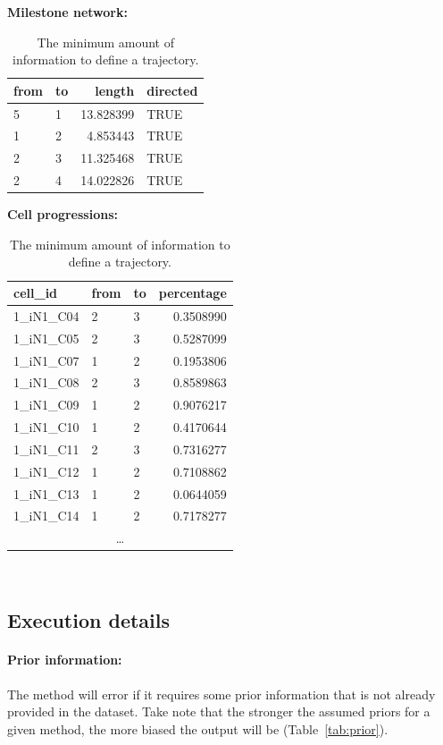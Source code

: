 \begin{table}
	\caption{The minimum amount of information to define a trajectory.}\label{tab:trajdata}
	\hfill
	\begin{minipage}[t]{.4\linewidth}
		\footnotesize
		\textbf{Milestone network:}

		\begin{tabular}{llrl}
			\toprule
			from & to & length & directed\\
			\midrule
			5 & 1 & 13.828399 & TRUE\\
			1 & 2 & 4.853443 & TRUE\\
			2 & 3 & 11.325468 & TRUE\\
			2 & 4 & 14.022826 & TRUE\\
			\bottomrule
		\end{tabular}
	\end{minipage}
	\hfill
	\begin{minipage}[t]{.4\linewidth}
		\footnotesize
		\textbf{Cell progressions:}

		\begin{tabular}{lllr}
		\toprule
		cell\_id & from & to & percentage\\
		\midrule
		1\_iN1\_C04 & 2 & 3 & 0.3508990\\
		1\_iN1\_C05 & 2 & 3 & 0.5287099\\
		1\_iN1\_C07 & 1 & 2 & 0.1953806\\
		1\_iN1\_C08 & 2 & 3 & 0.8589863\\
		1\_iN1\_C09 & 1 & 2 & 0.9076217\\
		1\_iN1\_C10 & 1 & 2 & 0.4170644\\
		1\_iN1\_C11 & 2 & 3 & 0.7316277\\
		1\_iN1\_C12 & 1 & 2 & 0.7108862\\
		1\_iN1\_C13 & 1 & 2 & 0.0644059\\
		1\_iN1\_C14 & 1 & 2 & 0.7178277\\
		\multicolumn{4}{c}{\ldots} \\
		\bottomrule
		\end{tabular}
	\end{minipage}
	\hfill\
\end{table}

\subsection{Execution details}

\paragraph{Prior information:} The method will error if it requires some prior information that is not
already provided in the dataset. Take note that the stronger the assumed priors for a given method, the more biased the output will be (Table~\ref{tab:prior}).

